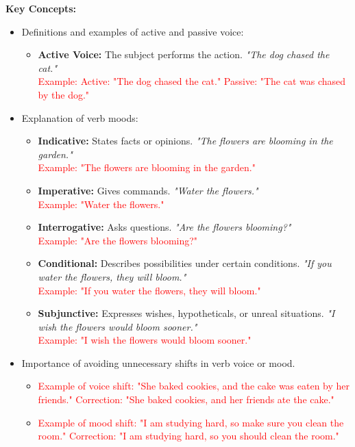 \documentclass[12pt]{article}
\begin{document}
\begin{tcolorbox}[colframe=black!60, colback=white, 
coltitle=black, colbacktitle=black!15, fonttitle=\bfseries\Large, 
title=Key Concepts and Vocabulary, halign title=center, left=10pt, right=10pt, top=10pt, bottom=15pt]
\textbf{Key Concepts:}
\begin{itemize}
    \item Definitions and examples of active and passive voice:
    \begin{itemize}
        \item \textbf{Active Voice:} The subject performs the action. \textit{"The dog chased the cat."} \\
        \textcolor{red}{Example: Active: "The dog chased the cat." Passive: "The cat was chased by the dog."}
    \end{itemize}
    \item Explanation of verb moods:
    \begin{itemize}
        \item \textbf{Indicative:} States facts or opinions. \textit{"The flowers are blooming in the garden."} \\
        \textcolor{red}{Example: "The flowers are blooming in the garden."}
        \item \textbf{Imperative:} Gives commands. \textit{"Water the flowers."} \\
        \textcolor{red}{Example: "Water the flowers."}
        \item \textbf{Interrogative:} Asks questions. \textit{"Are the flowers blooming?"} \\
        \textcolor{red}{Example: "Are the flowers blooming?"}
        \item \textbf{Conditional:} Describes possibilities under certain conditions. \textit{"If you water the flowers, they will bloom."} \\
        \textcolor{red}{Example: "If you water the flowers, they will bloom."}
        \item \textbf{Subjunctive:} Expresses wishes, hypotheticals, or unreal situations. \textit{"I wish the flowers would bloom sooner."} \\
        \textcolor{red}{Example: "I wish the flowers would bloom sooner."}
    \end{itemize}
    \item Importance of avoiding unnecessary shifts in verb voice or mood.
    \begin{itemize}
        \item \textcolor{red}{Example of voice shift: "She baked cookies, and the cake was eaten by her friends." Correction: "She baked cookies, and her friends ate the cake."}
        \item \textcolor{red}{Example of mood shift: "I am studying hard, so make sure you clean the room." Correction: "I am studying hard, so you should clean the room."}
    \end{itemize}
\end{itemize}
\end{tcolorbox}
\end{document}
